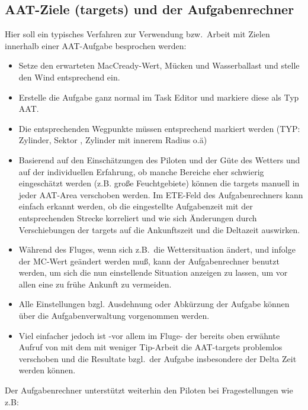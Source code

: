 \subsection*{AAT-Ziele (targets) und der Aufgabenrechner}
Hier soll ein typisches Verfahren zur Verwendung bzw.\ Arbeit mit Zielen innerhalb einer AAT-Aufgabe besprochen werden:
\begin{itemize}
\item Setze den erwarteten MacCready-Wert, Mücken und Wasserballast und stelle den Wind entsprechend ein.
\item Erstelle die Aufgabe ganz normal im Task Editor und markiere diese als Typ AAT.
\item  Die entsprechenden Wegpunkte müssen entsprechend markiert werden (TYP: Zylinder, Sektor , Zylinder mit innerem Radius o.ä)
\item Basierend auf den Einschätzungen des Piloten und der Güte des Wetters und auf der individuellen Erfahrung, ob manche Bereiche eher schwierig eingeschätzt werden (z.B. große Feuchtgebiete) können die targets manuell in jeder AAT-Area verschoben werden.
Im \textsf{ETE}-Feld des Aufgabenrechners kann einfach erkannt werden, ob die eingestellte Aufgabenzeit mit der entsprechenden Strecke korreliert und wie sich Änderungen durch Verschiebungen der targets auf die Ankunftszeit und die Deltazeit  auswirken.
\item Während des Fluges, wenn sich z.B.\ die Wettersituation ändert, und infolge der MC-Wert geändert werden muß,  kann der Aufgabenrechner benutzt werden, um sich die nun  einstellende Situation anzeigen zu lassen, um vor allen eine zu frühe Ankunft zu vermeiden.
\item Alle Einstellungen bzgl. Ausdehnung oder Abkürzung der Aufgabe können über die Aufgabenverwaltung vorgenommen werden.
\item \textcolor[rgb]{0.00,0.25,0.50}{\textsf{Viel einfacher jedoch ist -vor allem im Fluge- der bereits oben erwähnte Aufruf von}}
\blink{}\blink{}
mit dem mit weniger Tip-Arbeit die AAT-targets problemlos verschoben und die Resultate bzgl.\ der Aufgabe insbesondere der Delta Zeit werden können.
\end{itemize}
Der Aufgabenrechner unterstützt weiterhin den Piloten bei Fragestellungen wie z.B:\
